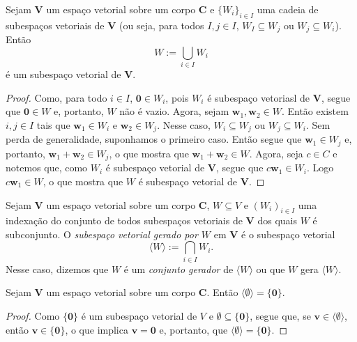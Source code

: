 \begin{prop}
	Sejam $\bm V$ um espaço vetorial sobre um corpo $\bm C$ e $\{W_i\}_{i \in I}$ uma cadeia de subespaços vetoriais de $\bm V$ (ou seja, para todos $I,j \in I$, $W_I \subseteq W_j$ ou $W_j \subseteq W_i$). Então
	\begin{equation*}
	W := \bigcup_{i \in I} W_i
	\end{equation*}
é um subespaço vetorial de $\bm V$.
\end{prop}
\begin{proof}
	Como, para todo $i \in I$, $\bm 0 \in W_i$, pois $W_i$ é subespaço vetoriasl de $\bm V$, segue que $\bm 0 \in W$ e, portanto, $W$ não é vazio. Agora, sejam $\bm w_1,\bm w_2 \in W$. Então existem $i,j \in I$ tais que $\bm w_1 \in W_i$ e $\bm w_2 \in W_j$. Nesse caso, $W_i \subseteq W_j$ ou $W_j \subseteq W_i$. Sem perda de generalidade, suponhamos o primeiro caso. Então segue que $\bm w_1 \in W_j$ e, portanto, $\bm w_1+\bm w_2 \in W_j$, o que mostra que $\bm w_1+\bm w_2 \in W$. Agora, seja $c \in C$ e notemos que, como $W_i$ é subespaço vetorial de $\bm V$, segue que $c\bm w_1 \in W_i$. Logo $c\bm w_1 \in W$, o que mostra que $W$ é subespaço vetorial de $\bm V$.
\end{proof}

\begin{defi}
	Sejam $\bm V$ um espaço vetorial sobre um corpo $\bm C$, $W \subseteq V$ e $(W_i)_{i \in I}$ uma indexação do conjunto de todos subespaços vetoriais de $\bm V$ dos quais $W$ é subconjunto. O \emph{subespaço vetorial gerado por $W$} em $\bm V$ é o subespaço vetorial
	\begin{equation*}
	\langle W \rangle := \bigcap_{i \in I} W_i.
	\end{equation*}
Nesse caso, dizemos que $W$ é um \emph{conjunto gerador} de $\langle W \rangle$ ou que $W$ gera $\langle W \rangle$.


\end{defi}

\begin{prop}
	Sejam $\bm V$ um espaço vetorial sobre um corpo $\bm C$. Então $\langle \emptyset \rangle = \{\bm 0\}$.
\end{prop}
\begin{proof}
	Como $\{\bm  0\}$ é um subespaço vetorial de $V$ e $\emptyset \subseteq \{\bm 0\}$, segue que, se $\bm v \in \langle \emptyset \rangle$, então $\bm v \in \{\bm 0\}$, o que implica $\bm v = \bm 0$ e, portanto, que $\langle \emptyset \rangle = \{\bm 0\}$.
\end{proof}

